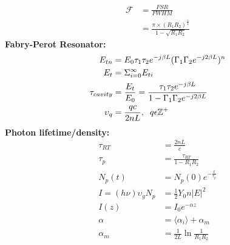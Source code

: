 \documentclass[landscape,a4paper]{article}
\begin{document}
\begin{multicols}{3}
\begin{align}
		\mathscr{F} &= \frac{FSR}{FWHM}\\
		&= \frac{\pi\times (R_1 R_2)^\frac{1}{4}}{1 - \sqrt{R_1 R_2}}
	\end{align}
	\hspace{3mm}\textbf{Fabry-Perot Resonator:}
	\begin{align}
		E_{tn} &= E_0 \tau_1 \tau_2 e^{-j\beta L} (\Gamma_1 \Gamma_2 e^{-j 2 \beta L})^n\\
		E_t &= \Sigma_{i=0}^\infty E_{ti}\\
		\tau_{cavity} &= \frac{E_t}{E_0} = \frac{\tau_1 \tau_2 e^{-j \beta L}}{1 - \Gamma_1 \Gamma_2 e^{-j2 \beta L}}\\
		\upsilon_q &= \frac{qc}{2nL},\hspace{2mm} q \epsilon \mathbb{Z^+}
	\end{align}
	\hspace{3mm}\textbf{Photon lifetime/density:}
	\begin{align}
		\tau_{RT} &= \frac{2nL}{c}\\
		\tau_p &= \frac{\tau_{RT}}{1 - R_1 R_2}\\
		N_p (t) &= N_p (0) e^{-\frac{t}{\tau_p}}\\
		I = (h\nu)\upsilon_g N_p &= \frac{1}{2} Y_0 n |E|^2\\
		I(z) &= I_0 e^{-\alpha z}\\
		\alpha &=  \langle\alpha_i\rangle + \alpha_m\\
		\alpha_m &= \frac{1}{2L} \ln \frac{1}{R_1 R_2}
	\end{align}
	

\end{multicols}
\end{document}
